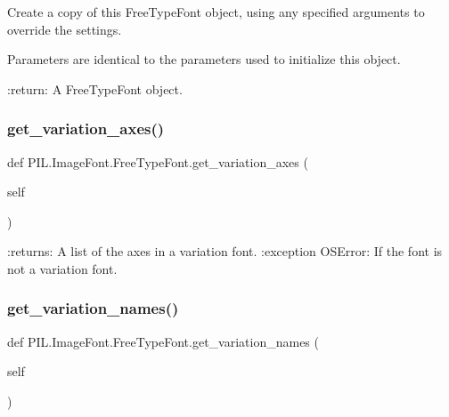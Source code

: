 \begin{DoxyVerb}Create a copy of this FreeTypeFont object,
using any specified arguments to override the settings.

Parameters are identical to the parameters used to initialize this
object.

:return: A FreeTypeFont object.
\end{DoxyVerb}
 \mbox{\label{classPIL_1_1ImageFont_1_1FreeTypeFont_aa15c3ae91540dcf56aec38d5fac5a88c}} 
\subsubsection{\texorpdfstring{get\+\_\+variation\+\_\+axes()}{get\_variation\_axes()}}
{\footnotesize\ttfamily def P\+I\+L.\+Image\+Font.\+Free\+Type\+Font.\+get\+\_\+variation\+\_\+axes (\begin{DoxyParamCaption}\item[{}]{self }\end{DoxyParamCaption})}

\begin{DoxyVerb}:returns: A list of the axes in a variation font.
:exception OSError: If the font is not a variation font.
\end{DoxyVerb}
 \mbox{\label{classPIL_1_1ImageFont_1_1FreeTypeFont_a750cbe6c5ab5602f0196c00bf483e4e0}} 
\subsubsection{\texorpdfstring{get\+\_\+variation\+\_\+names()}{get\_variation\_names()}}
{\footnotesize\ttfamily def P\+I\+L.\+Image\+Font.\+Free\+Type\+Font.\+get\+\_\+variation\+\_\+names (\begin{DoxyParamCaption}\item[{}]{self }\end{DoxyParamCaption})}

